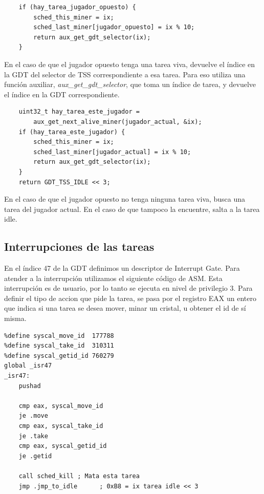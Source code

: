 \documentclass[a4paper]{article}
\newenvironment{codesnippet}{%
	\begin{Sbox}\begin{minipage}{\textwidth}\sffamily\small}%
	{\end{minipage}\end{Sbox}%
		\begin{center}%
		\vspace{-0.4cm}\colorbox{litegrey}{\TheSbox}\end{center}\vspace{0.3cm}}
\begin{document}
\begin{codesnippet}
  \begin{verbatim}
    if (hay_tarea_jugador_opuesto) {
        sched_this_miner = ix;
        sched_last_miner[jugador_opuesto] = ix % 10;
        return aux_get_gdt_selector(ix);
    }
  \end{verbatim}
\end{codesnippet}

En el caso de que el jugador opuesto tenga una tarea viva, devuelve el índice en la GDT del selector de TSS
correspondiente a esa tarea. Para eso utiliza una función auxiliar, \textit{aux_get_gdt_selector}, que toma un índice de
tarea, y devuelve el índice en la GDT correspondiente.

\begin{codesnippet}
  \begin{verbatim}
    uint32_t hay_tarea_este_jugador =
        aux_get_next_alive_miner(jugador_actual, &ix);
    if (hay_tarea_este_jugador) {
        sched_this_miner = ix;
        sched_last_miner[jugador_actual] = ix % 10;
        return aux_get_gdt_selector(ix);
    }
	return GDT_TSS_IDLE << 3;
  \end{verbatim}
\end{codesnippet}


En el caso de que el jugador opuesto no tenga ninguna tarea viva, busca una tarea del jugador actual. En el caso de que
tampoco la encuentre, salta a la tarea idle.


\subsection{Interrupciones de las tareas}
En el índice 47 de la GDT definimos un descriptor de Interrupt Gate. Para atender a la interrupción utilizamos el
siguiente código de ASM. Esta interrupción es de usuario, por lo tanto se ejecuta en nivel de privilegio 3. Para definir
el tipo de accion que pide la tarea, se pasa por el registro EAX un entero que indica si una tarea se desea mover, minar
un cristal, u obtener el id de sí misma.

\begin{codesnippet}
  \begin{verbatim}
%define syscal_move_id  177788
%define syscal_take_id  310311
%define syscal_getid_id 760279
global _isr47
_isr47:
    pushad

    cmp eax, syscal_move_id
    je .move
    cmp eax, syscal_take_id
    je .take
    cmp eax, syscal_getid_id
    je .getid

    call sched_kill ; Mata esta tarea
    jmp .jmp_to_idle      ; 0xB8 = ix tarea idle << 3
     \end{verbatim}
\end{codesnippet} 
\end{document}
